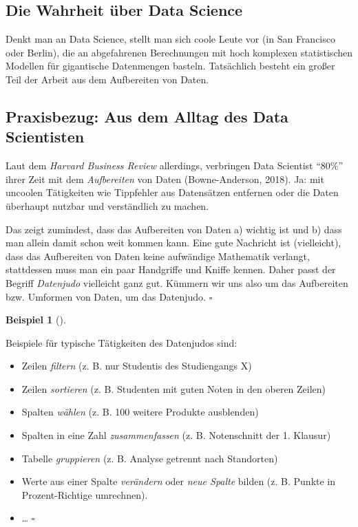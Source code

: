 \documentclass[
  a4paper,
]{scrbook}
\providecommand{\tightlist}{%
  \setlength{\itemsep}{0pt}\setlength{\parskip}{0pt}}\usepackage{longtable,booktabs,array}
\theoremstyle{definition}
\newtheorem{example}{Beispiel}[chapter]
\theoremstyle{definition}
\theoremstyle{definition}
\theoremstyle{remark}
\begin{document}
\subsection{Die Wahrheit über Data
Science}\label{die-wahrheit-uxfcber-data-science}

Denkt man an Data Science, stellt man sich coole Leute vor (in San
Francisco oder Berlin), die an abgefahrenen Berechnungen mit hoch
komplexen statistischen Modellen für gigantische Datenmengen basteln.
Tatsächlich besteht ein großer Teil der Arbeit aus dem Aufbereiten von
Daten.

\subsection{Praxisbezug: Aus dem Alltag des Data
Scientisten}\label{praxisbezug-aus-dem-alltag-des-data-scientisten}

Laut dem \emph{Harvard Business Review} allerdings, verbringen Data
Scientist ``80\%'' ihrer Zeit mit dem \emph{Aufbereiten} von Daten
(Bowne-Anderson, 2018). Ja: mit uncoolen Tätigkeiten wie Tippfehler aus
Datensätzen entfernen oder die Daten überhaupt nutzbar und verständlich
zu machen.

Das zeigt zumindest, dass das Aufbereiten von Daten a) wichtig ist und
b) dass man allein damit schon weit kommen kann. Eine gute Nachricht ist
(vielleicht), dass das Aufbereiten von Daten keine aufwändige Mathematik
verlangt, stattdessen muss man ein paar Handgriffe und Kniffe kennen.
Daher passt der Begriff \emph{Datenjudo} vielleicht ganz gut. Kümmern
wir uns also um das Aufbereiten bzw. Umformen von Daten, um das
Datenjudo. \(\square\)

\begin{example}[]\protect\hypertarget{exm-datenjudo}{}\label{exm-datenjudo}

Beispiele für typische Tätigkeiten des Datenjudos sind:

\begin{itemize}
\tightlist
\item
  Zeilen \emph{filtern} (z. B. nur Studentis des Studiengangs X)
\item
  Zeilen \emph{sortieren} (z. B. Studenten mit guten Noten in den oberen
  Zeilen)
\item
  Spalten \emph{wählen} (z. B. 100 weitere Produkte ausblenden)
\item
  Spalten in eine Zahl \emph{zusammenfassen} (z. B. Notenschnitt der 1.
  Klausur)
\item
  Tabelle \emph{gruppieren} (z. B. Analyse getrennt nach Standorten)
\item
  Werte aus einer Spalte \emph{verändern} oder \emph{neue Spalte} bilden
  (z. B. Punkte in Prozent-Richtige umrechnen).
\item
  \ldots{} \(\square\)
\end{itemize}

\end{example}
\end{document}
